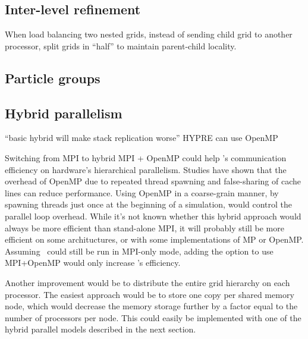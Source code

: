 \documentclass{article}
\begin{document}
\subsection{Inter-level refinement} \label{solution:amr-balance-split}

When load balancing two nested grids, instead of
sending child grid to another processor, split grids
in ``half'' to maintain parent-child locality.

\subsection{Particle groups} \label{solution:particles-group}

\vspace{2in}

\subsection{Hybrid parallelism}\label{solution:parallel-hybrid}

   ``basic hybrid will make stack replication worse''
   HYPRE can use OpenMP

  Switching from MPI to hybrid MPI + OpenMP could help \enzo's
  communication efficiency on hardware's hierarchical parallelism.
  Studies have shown that the overhead of OpenMP due to repeated
  thread spawning and false-sharing of cache lines can reduce
  performance.  Using OpenMP in a coarse-grain manner, by spawning
  threads just once at the beginning of a simulation, would control
  the parallel loop overhead.  While it's not known whether this
  hybrid approach would always be more efficient than stand-alone MPI,
  it will probably still be more efficient on some archituctures, or
  with some implementations of MP or OpenMP.  Assuming \enzo\ could
  still be run in MPI-only mode, adding the option to use MPI+OpenMP
  would only increase \enzo's efficiency.

  Another improvement would be to distribute the entire grid hierarchy
  on each processor.  The easiest approach would be to store one copy
  per shared memory node, which would decrease the memory storage
  further by a factor equal to the number of processors per node. This
  could easily be implemented with one of the hybrid parallel models
  described in the next section.
\end{document}
